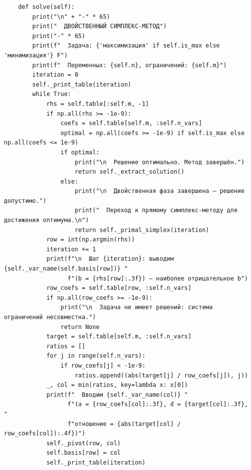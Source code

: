 \documentclass[oneside,a4paper,14pt]{extarticle}
\begin{document}
\begin{verbatim}
    def solve(self):
        print("\n" + "-" * 65)
        print("  ДВОЙСТВЕННЫЙ СИМПЛЕКС-МЕТОД")
        print("-" * 65)
        print(f"  Задача: {'максимизация' if self.is_max else 'минимизация'} F")
        print(f"  Переменных: {self.n}, ограничений: {self.m}")
        iteration = 0
        self._print_table(iteration)
        while True:
            rhs = self.table[:self.m, -1]
            if np.all(rhs >= -1e-9):
                coefs = self.table[self.m, :self.n_vars]
                optimal = np.all(coefs >= -1e-9) if self.is_max else np.all(coefs <= 1e-9)
                if optimal:
                    print("\n  Решение оптимально. Метод завершён.")
                    return self._extract_solution()
                else:
                    print("\n  Двойственная фаза завершена — решение допустимо.")
                    print("  Переход к прямому симплекс-методу для достижения оптимума.\n")
                    return self._primal_simplex(iteration)
            row = int(np.argmin(rhs))
            iteration += 1
            print(f"\n  Шаг {iteration}: выводим {self._var_name(self.basis[row])} "
                  f"(b = {rhs[row]:.3f}) — наиболее отрицательное b")
            row_coefs = self.table[row, :self.n_vars]
            if np.all(row_coefs >= -1e-9):
                print("\n  Задача не имеет решений: система ограничений несовместна.")
                return None
            target = self.table[self.m, :self.n_vars]
            ratios = []
            for j in range(self.n_vars):
                if row_coefs[j] < -1e-9:
                    ratios.append((abs(target[j] / row_coefs[j]), j))
            _, col = min(ratios, key=lambda x: x[0])
            print(f"  Вводим {self._var_name(col)} "
                  f"(a = {row_coefs[col]:.3f}, d = {target[col]:.3f}, "
                  f"отношение = {abs(target[col] / row_coefs[col]):.4f})")
            self._pivot(row, col)
            self.basis[row] = col
            self._print_table(iteration)


\end{verbatim}
\end{document}
